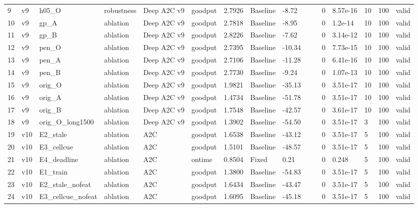 \documentclass[10pt]{article}
\begin{document}
\begin{landscape}
\begin{longtable}{@{}llllllllllllllll@{}}
9 & v9 & h05\_O & robustness & Deep A2C v9 & goodput & 2.7926 & Baseline & -8.72 &  &  & 0 & 8.57e-16 & 10 & 100 & valid \\
10 & v9 & gp\_A & ablation & Deep A2C v9 & goodput & 2.7818 & Baseline & -8.95 &  &  & 0 & 1.2e-14 & 10 & 100 & valid \\
11 & v9 & gp\_B & ablation & Deep A2C v9 & goodput & 2.8226 & Baseline & -7.62 &  &  & 0 & 3.14e-12 & 10 & 100 & valid \\
12 & v9 & pen\_O & ablation & Deep A2C v9 & goodput & 2.7395 & Baseline & -10.34 &  &  & 0 & 7.73e-15 & 10 & 100 & valid \\
13 & v9 & pen\_A & ablation & Deep A2C v9 & goodput & 2.7106 & Baseline & -11.28 &  &  & 0 & 6.41e-16 & 10 & 100 & valid \\
14 & v9 & pen\_B & ablation & Deep A2C v9 & goodput & 2.7730 & Baseline & -9.24 &  &  & 0 & 1.07e-13 & 10 & 100 & valid \\
15 & v9 & orig\_O & ablation & Deep A2C v9 & goodput & 1.9821 & Baseline & -35.13 &  &  & 0 & 3.51e-17 & 10 & 100 & valid \\
16 & v9 & orig\_A & ablation & Deep A2C v9 & goodput & 1.4734 & Baseline & -51.78 &  &  & 0 & 3.51e-17 & 10 & 100 & valid \\
17 & v9 & orig\_B & ablation & Deep A2C v9 & goodput & 1.7548 & Baseline & -42.57 &  &  & 0 & 3.61e-17 & 10 & 100 & valid \\
18 & v9 & orig\_O\_long1500 & ablation & Deep A2C v9 & goodput & 1.3902 & Baseline & -54.50 &  &  & 0 & 3.51e-17 & 3 & 100 & valid \\
19 & v10 & E2\_stale & ablation & A2C & goodput & 1.6538 & Baseline & -43.12 &  &  & 0 & 3.51e-17 & 5 & 100 & valid \\
20 & v10 & E3\_cellcue & ablation & A2C & goodput & 1.5101 & Baseline & -48.57 &  &  & 0 & 3.51e-17 & 5 & 100 & valid \\
21 & v10 & E4\_deadline & ablation & A2C & ontime & 0.8504 & Fixed & 0.21 &  &  & 0 & 0.248 & 5 & 100 & valid \\
22 & v10 & E1\_train & ablation & A2C & goodput & 1.3800 & Baseline & -54.83 &  &  & 0 & 3.51e-17 & 5 & 100 & valid \\
23 & v10 & E2\_stale\_nofeat & ablation & A2C & goodput & 1.6434 & Baseline & -43.47 &  &  & 0 & 3.51e-17 & 5 & 100 & valid \\
24 & v10 & E3\_cellcue\_nofeat & ablation & A2C & goodput & 1.6095 & Baseline & -45.18 &  &  & 0 & 3.51e-17 & 5 & 100 & valid \\

\end{longtable}
\end{landscape}
\end{document}
